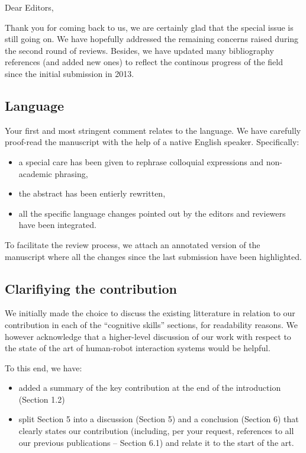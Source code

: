 \documentclass{article}
\begin{document}
Dear Editors,

\vspace{2em}

Thank you for coming back to us, we are certainly glad that the special issue is
still going on.  We have hopefully addressed the remaining concerns raised
during the second round of reviews.  Besides, we have updated many bibliography
references (and added new ones) to reflect the continous progress of the field
since the initial submission in 2013.

\subsection*{Language}

Your first and most stringent comment relates to the language. We have carefully
proof-read the manuscript with the help of a native English speaker.
Specifically:

\begin{itemize}
    \item a special care has been given to rephrase colloquial expressions and
        non-academic phrasing,
    \item the abstract has been entierly rewritten,
    \item all the specific language changes pointed out by the editors and
        reviewers have been integrated.
\end{itemize}

To facilitate the review process, we attach an annotated version of the
manuscript where all the changes since the last submission have been highlighted.

\subsection*{Clarifiying the contribution}

We initially made the choice to discuss the existing litterature in relation to
our contribution in each of the ``cognitive skills'' sections, for readability
reasons. We however acknowledge that a higher-level discussion of our work with
respect to the state of the art of human-robot interaction systems would be
helpful.

To this end, we have:

\begin{itemize}
    \item added a summary of the key contribution at the end of the introduction
        (Section 1.2)
    \item split Section 5 into a discussion (Section 5) and a
conclusion (Section 6) that clearly states our contribution (including, per your
request, references to all our previous publications -- Section 6.1) and relate
it to the start of the art.
\end{itemize}
\end{document}
